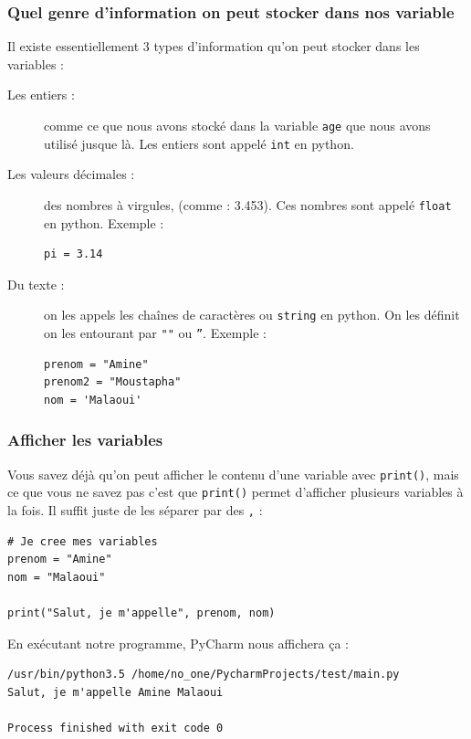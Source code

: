 \documentclass[12pt]{article}
\newcommand{\code}[1]{\colorbox{light-gray}{\texttt{#1}}}
\begin{document}
        \subsubsection{Quel genre d'information on peut stocker dans nos variable}
            Il existe essentiellement 3 types d'information qu'on peut stocker dans les variables :
            \begin{description}
                \item[Les entiers :] comme ce que nous avons stocké dans la variable \code{age} que nous avons 
                    utilisé jusque là. Les entiers sont appelé \code{int} en python.
                \item[Les valeurs décimales :] des nombres à virgules, (comme : 3.453). Ces nombres sont appelé 
                    \code{float} en python. Exemple :
                    \begin{lstlisting}[style=code]
pi = 3.14
                    \end{lstlisting}
                \item[Du texte :] on les appels les chaînes de caractères ou \code{string} en python. On les définit on les
                    entourant par \code{""} ou \code{''}. Exemple :
                    \begin{lstlisting}[style=code]
prenom = "Amine"
prenom2 = "Moustapha"
nom = 'Malaoui'
                    \end{lstlisting}
            \end{description}

        \subsubsection{Afficher les variables}
            Vous savez déjà qu'on peut afficher le contenu d'une variable avec \code{print()}, mais ce que vous 
            ne savez pas c'est que \code{print()} permet d'afficher plusieurs variables à la fois. Il suffit 
            juste de les séparer par des \code{,} :
            \begin{lstlisting}[style=code]
# Je cree mes variables
prenom = "Amine"
nom = "Malaoui"

print("Salut, je m'appelle", prenom, nom)
            \end{lstlisting}

            En exécutant notre programme, PyCharm nous affichera ça :

            \begin{lstlisting}[style=exec_result]
/usr/bin/python3.5 /home/no_one/PycharmProjects/test/main.py
Salut, je m'appelle Amine Malaoui

Process finished with exit code 0
            \end{lstlisting}
\end{document}
